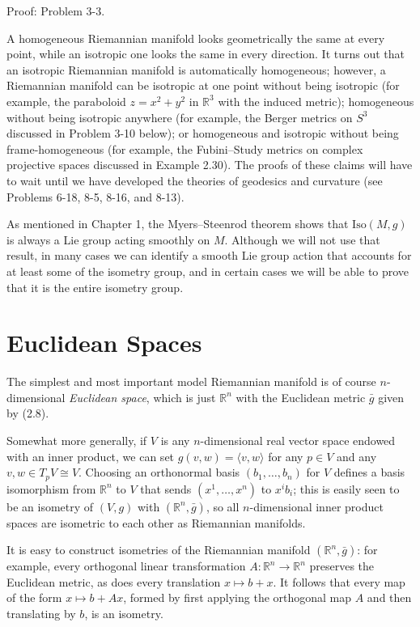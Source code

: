 Proof: Problem 3-3.

A homogeneous Riemannian manifold looks geometrically the same at every point, while an isotropic one looks the same in every direction. It turns out that an isotropic Riemannian manifold is automatically homogeneous; however, a Riemannian manifold can be isotropic at one point without being isotropic (for example, the paraboloid $z = x^2 + y^2$ in $\mathbb{R}^3$ with the induced metric); homogeneous without being isotropic anywhere (for example, the Berger metrics on $S^3$ discussed in Problem 3-10 below); or homogeneous and isotropic without being frame-homogeneous (for example, the Fubini--Study metrics on complex projective spaces discussed in Example 2.30). The proofs of these claims will have to wait until we have developed the theories of geodesics and curvature (see Problems 6-18, 8-5, 8-16, and 8-13).

As mentioned in Chapter 1, the Myers--Steenrod theorem shows that $\mathrm{Iso}(M, g)$ is always a Lie group acting smoothly on $M$. Although we will not use that result, in many cases we can identify a smooth Lie group action that accounts for at least some of the isometry group, and in certain cases we will be able to prove that it is the entire isometry group.

\section{Euclidean Spaces}

The simplest and most important model Riemannian manifold is of course $n$-dimensional \textit{Euclidean space}, which is just $\mathbb{R}^n$ with the Euclidean metric $\bar{g}$ given by (2.8).

Somewhat more generally, if $V$ is any $n$-dimensional real vector space endowed with an inner product, we can set $g(v, w) = \langle v, w \rangle$ for any $p \in V$ and any $v, w \in T_p V \cong V$. Choosing an orthonormal basis $(b_1, \ldots, b_n)$ for $V$ defines a basis isomorphism from $\mathbb{R}^n$ to $V$ that sends $(x^1, \ldots, x^n)$ to $x^i b_i$; this is easily seen to be an isometry of $(V, g)$ with $(\mathbb{R}^n, \bar{g})$, so all $n$-dimensional inner product spaces are isometric to each other as Riemannian manifolds.

It is easy to construct isometries of the Riemannian manifold $(\mathbb{R}^n, \bar{g})$: for example, every orthogonal linear transformation $A: \mathbb{R}^n \to \mathbb{R}^n$ preserves the Euclidean metric, as does every translation $x \mapsto b + x$. It follows that every map of the form $x \mapsto b + Ax$, formed by first applying the orthogonal map $A$ and then translating by $b$, is an isometry.

